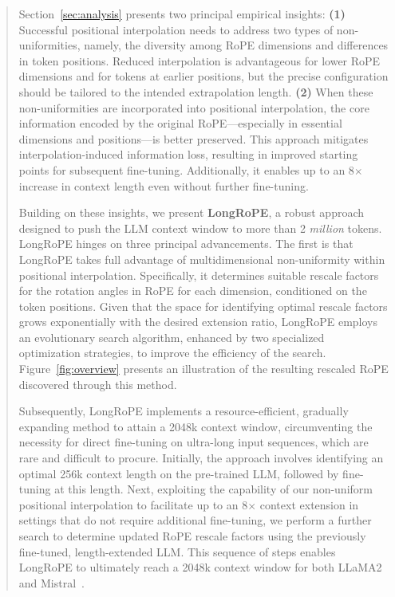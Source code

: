 \begin{abstract}
Section~\ref{sec:analysis} presents two principal empirical insights: \textbf{(1)} Successful positional interpolation needs to address two types of non-uniformities, namely, the diversity among RoPE dimensions and differences in token positions. Reduced interpolation is advantageous for lower RoPE dimensions and for tokens at earlier positions, but the precise configuration should be tailored to the intended extrapolation length. \textbf{(2)} When these non-uniformities are incorporated into positional interpolation, the core information encoded by the original RoPE—especially in essential dimensions and positions—is better preserved. This approach mitigates interpolation-induced information loss, resulting in improved starting points for subsequent fine-tuning. Additionally, it enables up to an 8$\times$ increase in context length even without further fine-tuning.

Building on these insights, we present \textbf{LongRoPE}, a robust approach designed to push the LLM context window to more than 2 \emph{million} tokens. LongRoPE hinges on three principal advancements. The first is that {LongRoPE} takes full advantage of multidimensional non-uniformity within positional interpolation. Specifically, it determines suitable rescale factors for the rotation angles in RoPE for each dimension, conditioned on the token positions. Given that the space for identifying optimal rescale factors grows exponentially with the desired extension ratio, {LongRoPE} employs an evolutionary search algorithm, enhanced by two specialized optimization strategies, to improve the efficiency of the search. Figure~\ref{fig:overview} presents an illustration of the resulting rescaled RoPE discovered through this method.

Subsequently, {LongRoPE} implements a resource-efficient, gradually expanding method to attain a 2048k context window, circumventing the necessity for direct fine-tuning on ultra-long input sequences, which are rare and difficult to procure. Initially, the approach involves identifying an optimal 256k context length on the pre-trained LLM, followed by fine-tuning at this length. Next, exploiting the capability of our non-uniform positional interpolation to facilitate up to an 8$\times$ context extension in settings that do not require additional fine-tuning, we perform a further search to determine updated RoPE rescale factors using the previously fine-tuned, length-extended LLM. This sequence of steps enables {LongRoPE} to ultimately reach a 2048k context window for both LLaMA2 and Mistral~\cite{mistral}.


\end{abstract}
